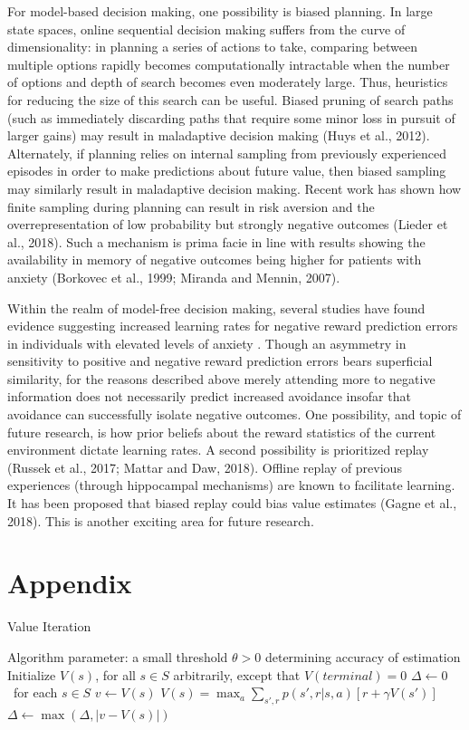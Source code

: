 \documentclass[11pt]{article} %
\begin{document}
For model-based decision making, one possibility is biased planning. In large
state spaces, online sequential decision making suffers from the curve of
dimensionality: in planning a series of actions to take, comparing between
multiple options rapidly becomes computationally intractable when the number of
options and depth of search becomes even moderately large. Thus, heuristics for
reducing the size of this search can be useful. Biased pruning of search paths
(such as immediately discarding paths that require some minor loss in pursuit of
larger gains) may result in maladaptive decision making (Huys et al., 2012).
Alternately, if planning relies on internal sampling from previously experienced
episodes in order to make predictions about future value, then biased sampling
may similarly result in maladaptive decision making. Recent work has shown how
finite sampling during planning can result in risk aversion and the overrepresentation
of low probability but strongly negative outcomes (Lieder et al., 2018). Such a
mechanism is prima facie in line with results showing the availability in memory
of negative outcomes being higher for patients with anxiety (Borkovec et al., 1999;
Miranda and Mennin, 2007).

Within the realm of model-free decision making, several studies have found evidence
suggesting increased learning rates for negative reward prediction errors in
individuals with elevated levels of anxiety \citep{Aylward, Huang2017, Harle2017
garrett2018}. Though an asymmetry in sensitivity to
positive and negative reward prediction errors bears superficial similarity, for
the reasons described above merely attending more to negative information does not
necessarily predict increased avoidance insofar that avoidance can successfully
isolate negative outcomes. One possibility, and topic of future research, is how
prior beliefs about the reward statistics of the current environment dictate
learning rates. A second possibility is prioritized replay (Russek et al., 2017;
Mattar and Daw, 2018). Offline replay of previous experiences (through hippocampal
mechanisms) are known to facilitate learning. It has been proposed that biased
replay could bias value estimates (Gagne et al., 2018). This is another exciting
area for future research.





\section{Appendix}

\begin{algorithm}
  \caption{Value Iteration}

  \State Algorithm parameter: a small threshold $\theta > 0$ determining accuracy of estimation
  \State Initialize $V(s)$, for all $s \in S$ arbitrarily, except that $V(terminal) = 0$
  \State
  \While{$\Delta > \theta$}
    \State $\Delta \leftarrow 0$
    \Loop \ for each $s \in S$
      \State $v \leftarrow V(s)$
      \State $ V(s) = \max_a \sum_{s',r} p(s',r|s,a) \left[ r + \gamma V(s') \right] $
      \State $\Delta \leftarrow \max(\Delta, |v - V(s)|)$
    \EndLoop
  \EndWhile

\end{algorithm}
\end{document}
